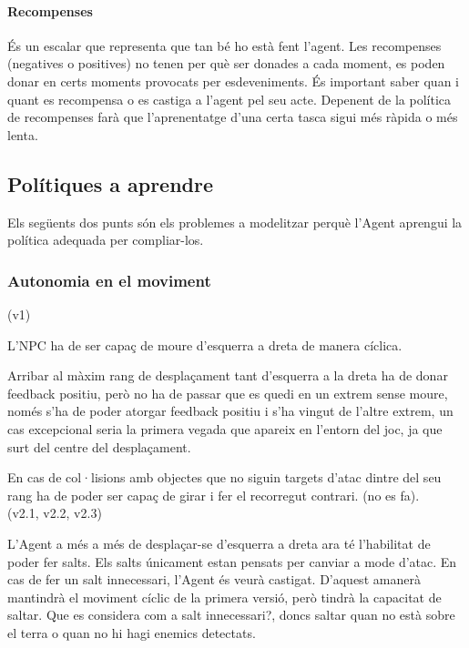 \documentclass{article}
\begin{document}
    \paragraph{Recompenses}
   És un escalar que representa que tan bé ho està fent l'agent. Les recompenses (negatives o positives) no tenen per què ser donades a cada moment, es poden donar en certs moments provocats per esdeveniments. És important saber quan i quant es recompensa o es castiga a l'agent pel seu acte. Depenent de la política de recompenses farà que l'aprenentatge d'una certa tasca sigui més ràpida o més lenta.
    
    \subsection{Polítiques a aprendre}
   Els següents dos punts són els problemes a modelitzar perquè l'Agent aprengui la política adequada per compliar-los.
    
    \subsubsection{Autonomia en el moviment}
    
    (v1)

    L'NPC ha de ser capaç de moure d'esquerra a dreta de manera cíclica.
    
    Arribar al màxim rang de desplaçament tant d'esquerra a la dreta ha de donar feedback positiu, però no ha de passar que es quedi en un extrem sense moure, només s'ha de poder atorgar feedback positiu i s'ha vingut de l'altre extrem, un cas excepcional seria la primera vegada que apareix en l'entorn del joc, ja que surt del centre del desplaçament.
    
    En cas de col·lisions amb objectes que no siguin targets d'atac dintre del seu rang ha de poder ser capaç de girar i fer el recorregut contrari. (no es fa). \\
    
    (v2.1, v2.2, v2.3)
    
    L'Agent a més a més de desplaçar-se d'esquerra a dreta ara té l'habilitat de poder fer salts. Els salts únicament estan pensats per canviar a mode d'atac.
    En cas de fer un salt innecessari, l'Agent és veurà castigat. D'aquest amanerà mantindrà el moviment cíclic de la primera versió, però tindrà la capacitat de saltar.
    Que es considera com a salt innecessari?, doncs saltar quan no està sobre el terra o quan no hi hagi enemics detectats.
    
\end{document}
